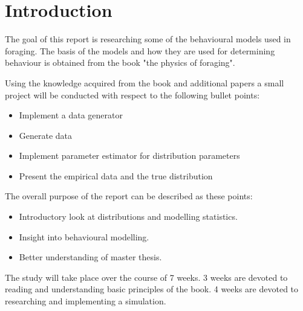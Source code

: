 \chapter{Introduction}
The goal of this report is researching some of the behavioural models used in foraging. The basis of the models and how they are used for determining behaviour is obtained from the book "the physics of foraging"\cite{viswanathan2011the}.

Using the knowledge acquired from the book and additional papers a small project will be conducted with respect to the following bullet points:
\begin{itemize}
\item Implement a data generator
\item Generate data
\item Implement parameter estimator for distribution parameters
\item Present the empirical data and the true distribution 
\end{itemize}

The overall purpose of the report can be described as these points:
\begin{itemize}
\item Introductory look at distributions and modelling statistics.
\item Insight into behavioural modelling.
\item Better understanding of master thesis.
\end{itemize}

The study will take place over the course of 7 weeks. 3 weeks are devoted to reading and understanding basic principles of the book. 4 weeks are devoted to researching and implementing a simulation.
